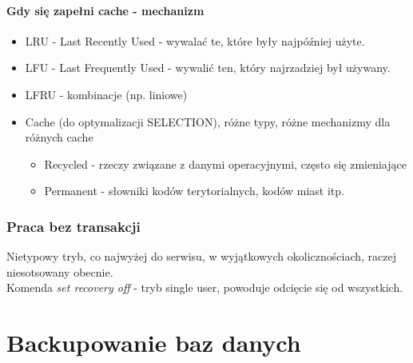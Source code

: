 \documentclass[a4paper,twoside]{article}
\begin{document}
  	\subsection*{Gdy się zapełni cache - mechanizm}
  	\begin{itemize}
  		\item LRU - Last Recently Used - wywalać te, które były najpóźniej użyte.
  		\item LFU - Last Frequently Used - wywalić ten, który najrzadziej był używany.
  		\item LFRU - kombinacje (np. liniowe)
  		\item Cache (do optymalizacji SELECTION), różne typy, różne mechanizmy dla różnych cache
  		\begin{itemize}
  			\item Recycled - rzeczy związane z danymi operacyjnymi, często się zmieniające
  			\item Permanent - słowniki kodów terytorialnych, kodów miast itp.
  		\end{itemize}
 	\end{itemize}
 	
  	\section*{Praca bez transakcji}
  	Nietypowy tryb, co najwyżej do serwisu, w wyjątkowych okolicznościach, raczej niesotsowany obecnie.\\
  	Komenda \emph{set recovery off} - tryb single user, powoduje odcięcie się od wszystkich.
  	
  	\part*{Backupowanie baz danych}
\end{document}
